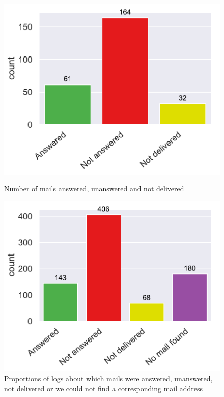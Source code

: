 \documentclass[\myrootdir/main.tex]{subfiles}
\begin{document}
\begin{figure}[htbp]
	\centering
	\begin{minipage}{0.45\textwidth}
		\centering
		\includegraphics[width=\textwidth, clip]{img/dev-mails/answers-received-mails.pdf}
		\caption{Number of mails answered, unanswered and not delivered}
		\label{fig:mails-answers-received-mails}
	\end{minipage}\hfill
	\begin{minipage}{0.45\textwidth}
		\centering
		\includegraphics[width=\textwidth, clip]{img/dev-mails/answers-received-builds.pdf}
		\caption{Proportions of logs about which mails were answered, unanswered, not delivered or we could not find a corresponding mail address}
		\label{fig:mails-answers-received-builds}
	\end{minipage}
\end{figure}
\end{document}
